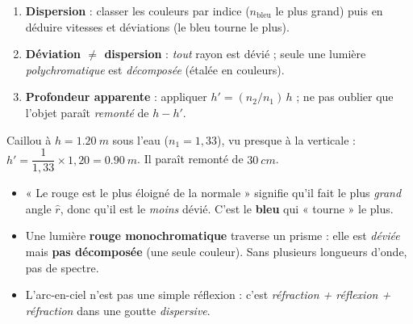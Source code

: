 \documentclass[11pt,a4paper]{article}
\begin{document}
\begin{methode}
\begin{enumerate}[leftmargin=1.7em,topsep=2pt,itemsep=1pt]
  \item \textbf{Dispersion} : classer les couleurs par indice ($n_{\text{bleu}}$ le plus grand) puis
        en déduire vitesses et déviations (le bleu tourne le plus).
  \item \textbf{Déviation $\ne$ dispersion} : \emph{tout} rayon est dévié ; seule une lumière
        \emph{polychromatique} est \emph{décomposée} (étalée en couleurs).
  \item \textbf{Profondeur apparente} : appliquer $h'=(n_2/n_1)\,h$ ; ne pas oublier que l'objet
        paraît \emph{remonté} de $h-h'$.
\end{enumerate}
\end{methode}

\begin{exemplebox}
Caillou à $h=\qty{1.20}{m}$ sous l'eau ($n_1=1{,}33$), vu presque à la verticale :
$h'=\dfrac{1}{1{,}33}\times1{,}20=\qty{0.90}{m}$. Il paraît remonté de $\qty{30}{cm}$.
\end{exemplebox}

\begin{piege}
\begin{itemize}[leftmargin=1.4em,topsep=2pt,itemsep=1pt]
  \item « Le rouge est le plus éloigné de la normale » signifie qu'il fait le plus \emph{grand} angle
        $\hat r$, donc qu'il est le \emph{moins} dévié. C'est le \textbf{bleu} qui « tourne » le plus.
  \item Une lumière \textbf{rouge monochromatique} traverse un prisme : elle est \emph{déviée} mais
        \textbf{pas décomposée} (une seule couleur). Sans plusieurs longueurs d'onde, pas de spectre.
  \item L'arc-en-ciel n'est pas une simple réflexion : c'est \emph{réfraction + réflexion + réfraction}
        dans une goutte \emph{dispersive}.
\end{itemize}
\end{piege}
\end{document}
